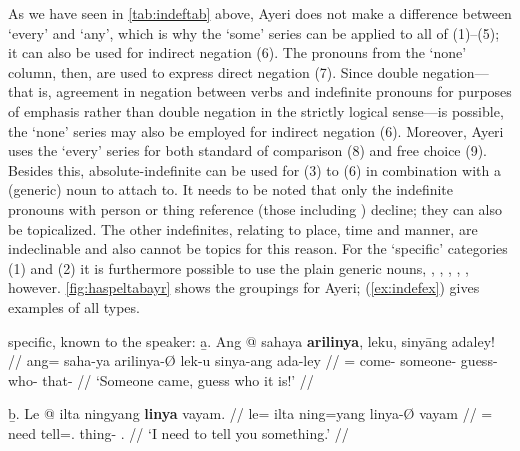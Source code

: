 As we have seen in \autoref{tab:indeftab} above, Ayeri does not make a
difference between `every' and `any', which is why the `some' series can be
applied to all of (1)--(5); it can also be used for indirect negation (6). The
pronouns from the `none' column, then, are used to express direct negation (7).
Since double negation---that is, agreement in negation between verbs and
indefinite pronouns for purposes of emphasis rather than double negation in the
strictly logical sense---is possible, the `none' series may also be employed
for indirect negation (6). Moreover, Ayeri uses the `every' series for both
standard of comparison (8) and free choice (9). Besides this, 
absolute-indefinite  can be used for (3) to (6) in combination 
with a (generic) noun to attach to. It needs to be noted that only the 
indefinite pronouns with person or thing reference (those including 
) decline; they can also be topicalized. The other indefinites, 
relating to place, time and manner, are indeclinable and also cannot be topics 
for this reason.
%
%
For the `specific' categories (1) and (2) it is furthermore possible to use the
plain generic nouns, , ,
, , , 
however. \autoref{fig:haspeltabayr} shows the groupings for Ayeri; 
(\ref{ex:indefex}) gives examples of all types.

\pex[labeltype=numeric,interpartskip=1em]\label{ex:indefex}
\a specific, known to the speaker:\vspace{.5em} %
	\beginsubsub
	\b{a.} \begingl
		\gla Ang @ sahaya \textbf{arilinya}, leku, sinyāng adaley! //
		\glb ang= saha-ya arilinya-Ø lek-u sinya-ang ada-ley //
		\glc \AgtT{}= come-\TsgM{} someone-\Top{} guess-\Imp{} 
			who-\Aarg{} that-\PargI{} //
		\glft `Someone came, guess who it is!' //
		\endgl\vspace{.5em}
		
	\b{b.} \begingl
		\gla Le @ ilta ningyang \textbf{linya} vayam. //
		\glb le= ilta ning=yang linya-Ø vayam //
		\glc \PatTI{}= need tell=\Fsg{}.\Aarg{} thing-\Top{} 
			\Second{}.\Dat{} //
		\glft `I need to tell you something.' //
		\endgl
	\endsubsub

